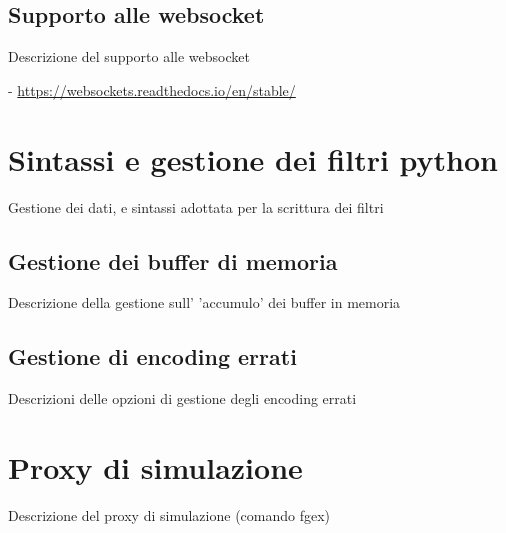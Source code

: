 \subsection{Supporto alle websocket}

Descrizione del supporto alle websocket

- \url{https://websockets.readthedocs.io/en/stable/}

\section{Sintassi e gestione dei filtri python}

Gestione dei dati, e sintassi adottata per la scrittura dei filtri

\subsection{Gestione dei buffer di memoria}

Descrizione della gestione sull' 'accumulo' dei buffer in memoria

\subsection{Gestione di encoding errati}

Descrizioni delle opzioni di gestione degli encoding errati

\section{Proxy di simulazione}

Descrizione del proxy di simulazione (comando fgex)
